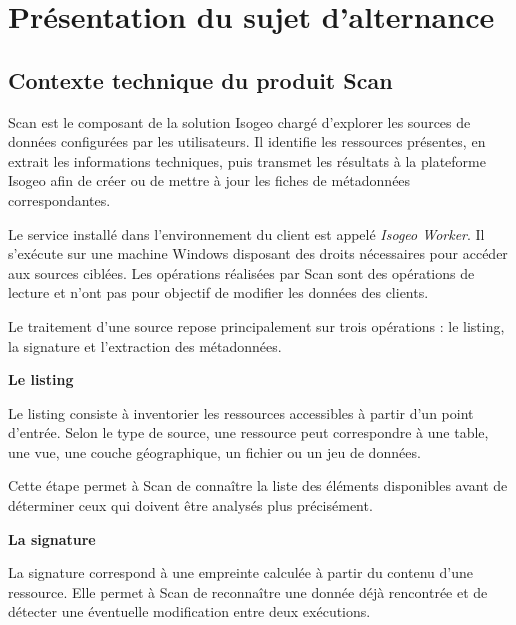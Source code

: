 \section{Présentation du sujet d'alternance}
\label{sec:sujet_alternance}


\subsection{Contexte technique du produit Scan}
\label{subsec:contexte_scan}

Scan est le composant de la solution Isogeo chargé d'explorer les sources de
données configurées par les utilisateurs. Il identifie les ressources
présentes, en extrait les informations techniques, puis transmet les résultats
à la plateforme Isogeo afin de créer ou de mettre à jour les fiches de
métadonnées correspondantes.

Le service installé dans l'environnement du client est appelé
\textit{Isogeo Worker}. Il s'exécute sur une machine Windows disposant des
droits nécessaires pour accéder aux sources ciblées. Les opérations réalisées
par Scan sont des opérations de lecture et n'ont pas pour objectif de modifier
les données des clients.

Le traitement d'une source repose principalement sur trois opérations : le
listing, la signature et l'extraction des métadonnées.

\medskip

\noindent
\textbf{Le listing}

\medskip

Le listing consiste à inventorier les ressources accessibles à partir d'un
point d'entrée. Selon le type de source, une ressource peut correspondre à une
table, une vue, une couche géographique, un fichier ou un jeu de données.

Cette étape permet à Scan de connaître la liste des éléments disponibles avant
de déterminer ceux qui doivent être analysés plus précisément.

\medskip

\noindent
\textbf{La signature}

\medskip

La signature correspond à une empreinte calculée à partir du contenu d'une
ressource. Elle permet à Scan de reconnaître une donnée déjà rencontrée et de
détecter une éventuelle modification entre deux exécutions.

